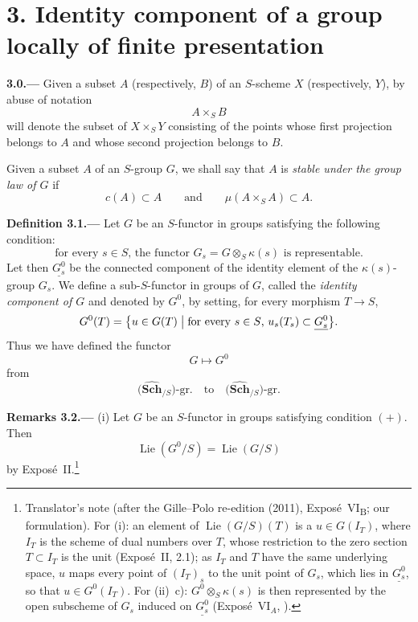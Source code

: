 
\section*{3. Identity component of a group locally of finite
  presentation}
\label{sec:sga3-VIB-3}

\medskip
{}\label{par:sga3-VIB-3.0}%
\noindent\textbf{3.0.---}
Given a subset \(A\) (respectively, \(B\)) of an \(S\)-scheme
\(X\) (respectively, \(Y\)), by abuse of notation
\[
  A\times_S B
\]
will denote the subset of \(X\times_S Y\) consisting of the points
whose first projection belongs to \(A\) and whose second projection
belongs to \(B\).

Given a subset \(A\) of an \(S\)-group \(G\), we shall say that
\(A\) is \emph{stable under the group law of \(G\)} if
\[
  c(A)\subset A
  \qquad\text{and}\qquad
  \mu(A\times_S A)\subset A.
\]

\medskip
{}\label{def:sga3-VIB-3.1}%
\noindent\textbf{Definition 3.1.---}
Let \(G\) be an \(S\)-functor in groups satisfying the following
condition:
\[
  \tag{+}\label{sga3:vi:definition:3-1:equation:plus}
  \text{for every \(s\in S\), the functor
  \(G_s=G\otimes_S\kappa(s)\) is representable.}
\]
Let then \(\underline{G_s^0}\) be the connected component of
the identity element of the \(\kappa(s)\)-group \(G_s\).
We define a sub-\(S\)-functor in groups of \(G\), called the
\emph{identity component of \(G\)} and denoted by \(G^0\), by
setting, for every morphism \(T\to S\),
\[
  G^0(T)
    =
  \bigl\{u\in G(T)\bigm|
    \text{for every \(s\in S\), }
    u_s(T_s)\subset\underline{G_s^0}\bigr\}.
\]
Thus we have defined the functor
\[
  G\longmapsto G^0
\]
from
\[
  \bigl(\widehat{\mathbf{Sch}}_{/S}\bigr)\text{-gr.}
  \quad\text{to}\quad
  \bigl(\widehat{\mathbf{Sch}}_{/S}\bigr)\text{-gr.}
\]

\medskip
{}\label{rem:sga3-VIB-3.2}%
\noindent\textbf{Remarks 3.2.---}
\textup{(i)} Let \(G\) be an \(S\)-functor in groups satisfying
condition \((+)\). Then
\[
  \operatorname{Lie}(G^0/S)=\operatorname{Lie}(G/S)
\]
by Expos\'e~II.\footnote{Translator's note (after the Gille--Polo re-edition (2011), Expos\'e~VI\textsubscript{B}; our
formulation). For (i): an element of \(\operatorname{Lie}(G/S)(T)\) is a \(u\in G(I_T)\), where \(I_T\) is
the scheme of dual numbers over \(T\), whose restriction to the zero section \(T\subset I_T\) is the unit
(Expos\'e~II, 2.1); as \(I_T\) and \(T\) have the same underlying space, \(u\) maps every point of
\((I_T)_s\) to the unit point of \(G_s\), which lies in \(\underline{G_s^0}\), so that \(u\in G^0(I_T)\). For
(ii)~c): \(G^0\otimes_S\kappa(s)\) is then represented by the open subscheme of \(G_s\) induced on
\(\underline{G_s^0}\) (Expos\'e~VI\(_A\), ).}

